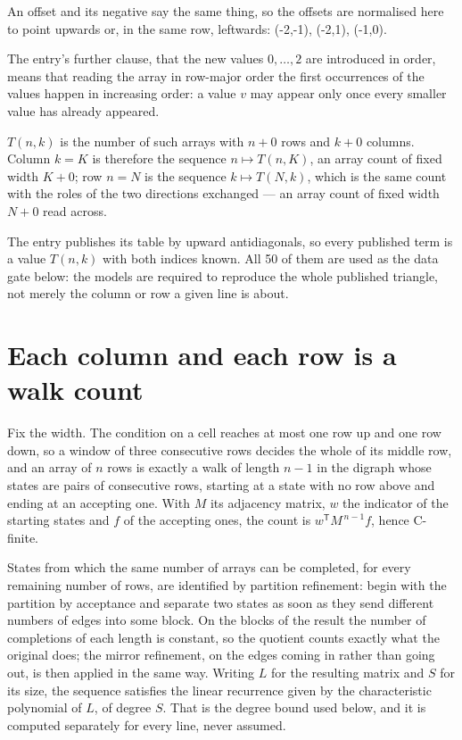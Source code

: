 \documentclass[11pt]{article}
\theoremstyle{definition}
\begin{document}
An offset and its negative say the same thing, so the offsets are normalised here to point upwards or, in the same row, leftwards: (-2,-1), (-2,1), (-1,0).

The entry's further clause, that the new values $0,\dots,2$ are introduced in order, means that reading the array in row-major order the first occurrences of the values happen in increasing order: a value $v$ may appear only once every smaller value has already appeared.

$T(n,k)$ is the number of such arrays with $n + 0$ rows and $k + 0$ columns. Column $k = K$ is therefore the sequence $n \mapsto T(n,K)$, an array count of fixed width $K + 0$; row $n = N$ is the sequence $k \mapsto T(N,k)$, which is the same count with the roles of the two directions exchanged --- an array count of fixed width $N + 0$ read across.

The entry publishes its table by upward antidiagonals, so every published term is a value $T(n,k)$ with both indices known. All 50 of them are used as the data gate below: the models are required to reproduce the whole published triangle, not merely the column or row a given line is about.

\section{Each column and each row is a walk count}

Fix the width. The condition on a cell reaches at most one row up and one row down, so a window of three consecutive rows decides the whole of its middle row, and an array of $n$ rows is exactly a walk of length $n-1$ in the digraph whose states are pairs of consecutive rows, starting at a state with no row above and ending at an accepting one. With $M$ its adjacency matrix, $w$ the indicator of the starting states and $f$ of the accepting ones, the count is $w^{\mathsf T}M^{\,n-1}f$, hence C-finite.

States from which the same number of arrays can be completed, for every remaining number of rows, are identified by partition refinement: begin with the partition by acceptance and separate two states as soon as they send different numbers of edges into some block. On the blocks of the result the number of completions of each length is constant, so the quotient counts exactly what the original does; the mirror refinement, on the edges coming in rather than going out, is then applied in the same way. Writing $L$ for the resulting matrix and $S$ for its size, the sequence satisfies the linear recurrence given by the characteristic polynomial of $L$, of degree $S$. That is the degree bound used below, and it is computed separately for every line, never assumed.
\end{document}
